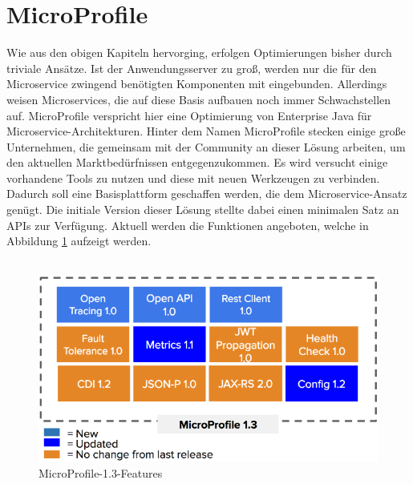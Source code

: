 \section{MicroProfile}
Wie aus den obigen Kapiteln hervorging, erfolgen Optimierungen bisher durch triviale Ansätze. Ist der Anwendungsserver zu groß, werden nur die für den Microservice zwingend benötigten Komponenten mit eingebunden. Allerdings weisen Microservices, die auf diese Basis aufbauen noch immer Schwachstellen auf. MicroProfile verspricht hier eine Optimierung von Enterprise Java für Microservice-Architekturen. Hinter dem Namen MicroProfile stecken einige große Unternehmen, die gemeinsam mit der Community an dieser Lösung arbeiten, um den aktuellen Marktbedürfnissen entgegenzukommen. Es wird versucht einige vorhandene Tools zu nutzen und diese mit neuen Werkzeugen zu verbinden. Dadurch soll eine Basisplattform geschaffen werden, die dem Microservice-Ansatz genügt. Die initiale Version dieser Lösung stellte dabei einen minimalen Satz an APIs zur Verfügung. Aktuell werden die Funktionen angeboten, welche in Abbildung \ref{fig:features1.3} aufzeigt werden.  \\ \\
\begin{figure}[h!]
	\centering
	\includegraphics[width=1.0\linewidth]{images/Microprofile13}
	\caption{MicroProfile-1.3-Features \cite{Microprofile.2017}} %
	\label{fig:features1.3}
\end{figure}
